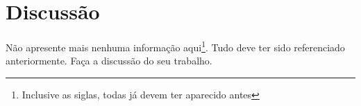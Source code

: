 \setlength{\parskip}{1.5pt}
\chapter[Discussão]{Discussão}

Não apresente mais nenhuma informação aqui\footnote{Inclusive as siglas, todas já devem ter aparecido antes}. Tudo deve ter sido referenciado anteriormente. Faça a discussão do seu trabalho.

